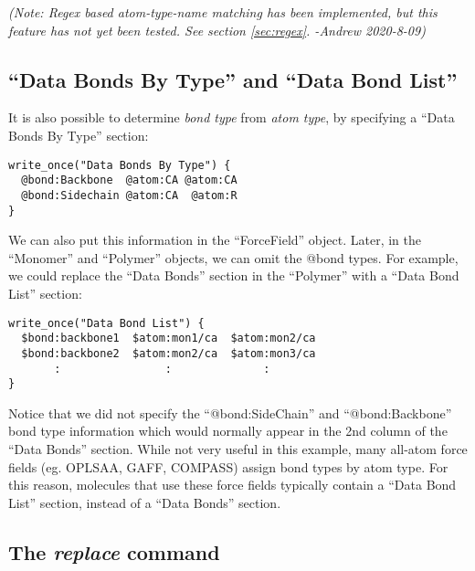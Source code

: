 \documentclass[11pt]{article}
\begin{document}
\textit{(Note: Regex based atom-type-name matching 
has been implemented, but this feature has not yet been tested.
See section \ref{sec:regex}.  -Andrew 2020-8-09)}


\subsection{``Data Bonds By Type'' and ``Data Bond List''}
It is also possible to determine \textit{bond type} from \textit{atom type},
by specifying a ``Data Bonds By Type'' section:
\begin{verbatim}
write_once("Data Bonds By Type") {
  @bond:Backbone  @atom:CA @atom:CA
  @bond:Sidechain @atom:CA  @atom:R
}
\end{verbatim}
We can also put this information in the ``ForceField'' object.  Later, in the
``Monomer'' and ``Polymer'' objects, we can omit the @bond types.
For example, we could replace the ``Data Bonds'' section in the ``Polymer''
with a ``Data Bond List'' section:
\begin{verbatim}
write_once("Data Bond List") {
  $bond:backbone1  $atom:mon1/ca  $atom:mon2/ca
  $bond:backbone2  $atom:mon2/ca  $atom:mon3/ca
       :                :              :
}
\end{verbatim}
Notice that we did not specify the ``@bond:SideChain'' and ``@bond:Backbone''
bond type information which would normally appear in the 2nd column
of the ``Data Bonds'' section.  While not very useful in this example,
many all-atom force fields (eg. OPLSAA, GAFF, COMPASS) assign bond types
by atom type.  For this reason, molecules that use these force fields
typically contain a ``Data Bond List'' section, instead of a
``Data Bonds'' section.



\subsection{The \textit{replace} command}
\label{sec:replace_command}
\end{document}
